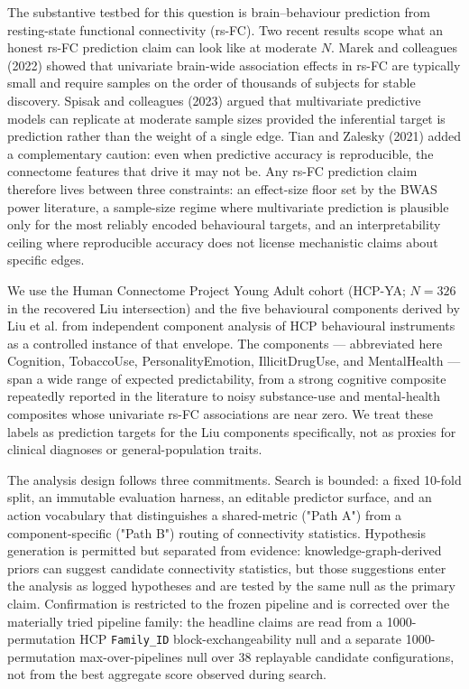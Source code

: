 \documentclass[11pt,letterpaper]{report}
\begin{document}
The substantive testbed for this question is brain--behaviour prediction from resting-state functional connectivity (rs-FC). Two recent results scope what an honest rs-FC prediction claim can look like at moderate $N$. Marek and colleagues (2022) showed that univariate brain-wide association effects in rs-FC are typically small and require samples on the order of thousands of subjects for stable discovery. Spisak and colleagues (2023) argued that multivariate predictive models can replicate at moderate sample sizes provided the inferential target is prediction rather than the weight of a single edge. Tian and Zalesky (2021) added a complementary caution: even when predictive accuracy is reproducible, the connectome features that drive it may not be. Any rs-FC prediction claim therefore lives between three constraints: an effect-size floor set by the BWAS power literature, a sample-size regime where multivariate prediction is plausible only for the most reliably encoded behavioural targets, and an interpretability ceiling where reproducible accuracy does not license mechanistic claims about specific edges.

We use the Human Connectome Project Young Adult cohort (HCP-YA; $N = 326$ in the recovered Liu intersection) and the five behavioural components derived by Liu et al. from independent component analysis of HCP behavioural instruments as a controlled instance of that envelope. The components --- abbreviated here Cognition, TobaccoUse, PersonalityEmotion, IllicitDrugUse, and MentalHealth --- span a wide range of expected predictability, from a strong cognitive composite repeatedly reported in the literature to noisy substance-use and mental-health composites whose univariate rs-FC associations are near zero. We treat these labels as prediction targets for the Liu components specifically, not as proxies for clinical diagnoses or general-population traits.

The analysis design follows three commitments. Search is bounded: a fixed 10-fold split, an immutable evaluation harness, an editable predictor surface, and an action vocabulary that distinguishes a shared-metric ("Path A") from a component-specific ("Path B") routing of connectivity statistics. Hypothesis generation is permitted but separated from evidence: knowledge-graph-derived priors can suggest candidate connectivity statistics, but those suggestions enter the analysis as logged hypotheses and are tested by the same null as the primary claim. Confirmation is restricted to the frozen pipeline and is corrected over the materially tried pipeline family: the headline claims are read from a 1000-permutation HCP \texttt{Family\_ID} block-exchangeability null and a separate 1000-permutation max-over-pipelines null over 38 replayable candidate configurations, not from the best aggregate score observed during search.
\end{document}
